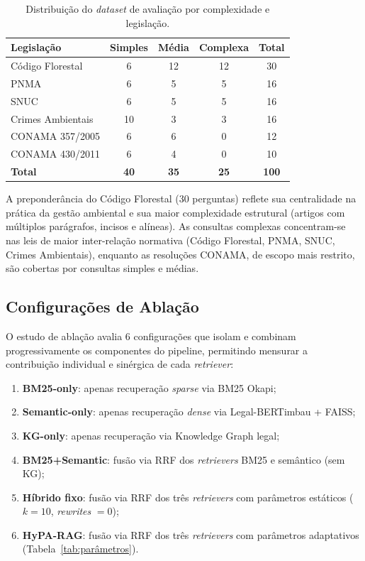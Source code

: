 \documentclass[12pt]{article}
\begin{document}
\begin{table}[ht]
\centering
\caption{Distribuição do \textit{dataset} de avaliação por complexidade e legislação.}
\label{tab:dataset}
\begin{tabular}{lcccc}
\toprule
\textbf{Legislação} & \textbf{Simples} & \textbf{Média} & \textbf{Complexa} & \textbf{Total} \\
\midrule
Código Florestal & 6 & 12 & 12 & 30 \\
PNMA & 6 & 5 & 5 & 16 \\
SNUC & 6 & 5 & 5 & 16 \\
Crimes Ambientais & 10 & 3 & 3 & 16 \\
CONAMA 357/2005 & 6 & 6 & 0 & 12 \\
CONAMA 430/2011 & 6 & 4 & 0 & 10 \\
\midrule
\textbf{Total} & \textbf{40} & \textbf{35} & \textbf{25} & \textbf{100} \\
\bottomrule
\end{tabular}
\end{table}

A preponderância do Código Florestal (30 perguntas) reflete sua centralidade na prática da gestão ambiental e sua maior complexidade estrutural (artigos com múltiplos parágrafos, incisos e alíneas). As consultas complexas concentram-se nas leis de maior inter-relação normativa (Código Florestal, PNMA, SNUC, Crimes Ambientais), enquanto as resoluções CONAMA, de escopo mais restrito, são cobertas por consultas simples e médias.

\subsection{Configurações de Ablação}

O estudo de ablação avalia 6 configurações que isolam e combinam progressivamente os componentes do pipeline, permitindo mensurar a contribuição individual e sinérgica de cada \textit{retriever}:

\begin{enumerate}
\item \textbf{BM25-only}: apenas recuperação \textit{sparse} via BM25 Okapi;
\item \textbf{Semantic-only}: apenas recuperação \textit{dense} via Legal-BERTimbau + FAISS;
\item \textbf{KG-only}: apenas recuperação via Knowledge Graph legal;
\item \textbf{BM25+Semantic}: fusão via RRF dos \textit{retrievers} BM25 e semântico (sem KG);
\item \textbf{Híbrido fixo}: fusão via RRF dos três \textit{retrievers} com parâmetros estáticos ($k = 10$, \textit{rewrites} $= 0$);
\item \textbf{HyPA-RAG}: fusão via RRF dos três \textit{retrievers} com parâmetros adaptativos (Tabela~\ref{tab:parâmetros}).
\end{enumerate}
\end{document}

